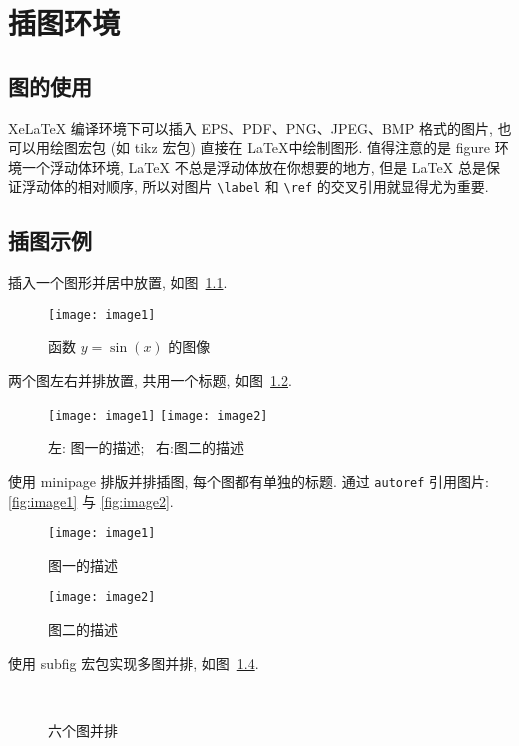 

\chapter{插图环境}

\section{图的使用}

XeLaTeX 编译环境下可以插入 EPS、PDF、PNG、JPEG、BMP 格式的图片, 也可以用绘图宏包 (如 tikz 宏包) 直接在 \LaTeX 中绘制图形. 值得注意的是 figure 环境一个浮动体环境, LaTeX 不总是浮动体放在你想要的地方, 但是 LaTeX 总是保证浮动体的相对顺序, 所以对图片 \verb|\label| 和 \verb|\ref| 的交叉引用就显得尤为重要.

\section{插图示例}

插入一个图形并居中放置, 如图~\ref{fig:sinx}.
\begin{figure}[htp!]
\centering
\texttt{[image: image1]}
\caption{函数 $y=\sin(x)$ 的图像}\label{fig:sinx}
\end{figure}

两个图左右并排放置, 共用一个标题, 如图~\ref{fig:image}.
\begin{figure}[htp!]
\centering
\texttt{[image: image1]}
\hfill
\texttt{[image: image2]}
\caption{左: 图一的描述;~ 右:图二的描述}
\label{fig:image}
\end{figure}

\clearpage
使用 minipage 排版并排插图, 每个图都有单独的标题. 通过 \verb|autoref| 引用图片: \autoref{fig:image1} 与 \autoref{fig:image2}.
\begin{figure}[htp!]
\begin{minipage}[t]{0.48\linewidth}
\centering
\texttt{[image: image1]}
\caption{图一的描述}
\label{fig:image1}
\end{minipage}
\hfill
\begin{minipage}[t]{0.48\linewidth}
\centering
\texttt{[image: image2]}
\caption{图二的描述}
\label{fig:image2}
\end{minipage}
\end{figure}

使用 subfig 宏包实现多图并排, 如图~\ref{fig:images}.
\begin{figure}[htp!]
\centering
{}
\hfill
{}
\hfill
{} \\
\hfill
{}
\hfill
{}
\caption{六个图并排}
\label{fig:images}
\end{figure}

